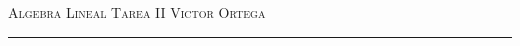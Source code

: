 \documentclass[12pt]{article}
\begin{document}
\thispagestyle{empty}

{\scshape Algebra Lineal} \hfill {\scshape \large Tarea II} \hfill {\scshape Victor Ortega}
 
\smallskip

\hrule

\bigskip

\bigskip

\theoremstyle{definition}
\newtheorem*{definition}{Definición}

\theoremstyle{definition}
\newtheorem*{dem}{Demostración}

\theoremstyle{definition}
\newtheorem*{notation}{Notación}

\theoremstyle{definition}
\newtheorem*{theorem}{Teorema}

\theoremstyle{definition}
\newtheorem*{lema}{Lema}

\theoremstyle{remark}
\newtheorem*{observation}{Observación}

\theoremstyle{remark}
\newtheorem*{example}{Ejemplo}
\end{document}
